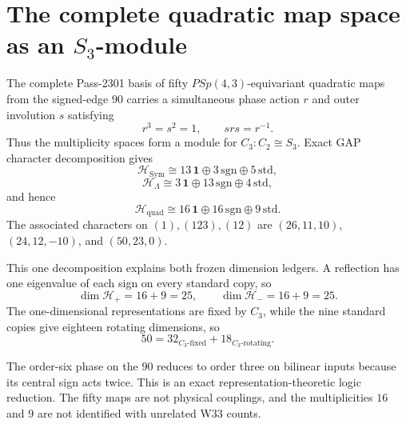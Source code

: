 \section*{The complete quadratic map space as an $S_3$-module}

The complete Pass-2301 basis of fifty $PSp(4,3)$-equivariant quadratic maps
from the signed-edge $90$ carries a simultaneous phase action $r$ and outer
involution $s$ satisfying
\[
r^3=s^2=1,\qquad srs=r^{-1}.
\]
Thus the multiplicity spaces form a module for $C_3:C_2\cong S_3$.  Exact GAP
character decomposition gives
\[
\mathcal H_{\mathrm{Sym}}
 \cong13\,\mathbf1\oplus3\,\mathrm{sgn}\oplus5\,\mathrm{std},
\]
\[
\mathcal H_{\Lambda}
 \cong3\,\mathbf1\oplus13\,\mathrm{sgn}\oplus4\,\mathrm{std},
\]
and hence
\[
\mathcal H_{\mathrm{quad}}
 \cong16\,\mathbf1\oplus16\,\mathrm{sgn}\oplus9\,\mathrm{std}.
\]
The associated characters on $(1),(123),(12)$ are
$(26,11,10)$, $(24,12,-10)$, and $(50,23,0)$.

This one decomposition explains both frozen dimension ledgers.  A reflection
has one eigenvalue of each sign on every standard copy, so
\[
\dim\mathcal H_+=16+9=25,
\qquad
\dim\mathcal H_-=16+9=25.
\]
The one-dimensional representations are fixed by $C_3$, while the nine
standard copies give eighteen rotating dimensions, so
\[
50=32_{C_3\text{-fixed}}+18_{C_3\text{-rotating}}.
\]

The order-six phase on the $90$ reduces to order three on bilinear inputs
because its central sign acts twice.  This is an exact representation-theoretic
logic reduction.  The fifty maps are not physical couplings, and the
multiplicities $16$ and $9$ are not identified with unrelated W33 counts.

